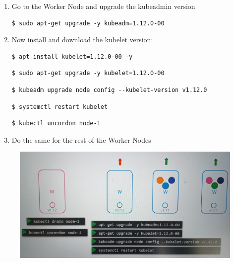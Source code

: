 \documentclass{article}
\newenvironment{codetemplate}[1][]{%
  \mybasecolorbox[#1]
  \itshape
}{%
  \endmybasecolorbox
}
\begin{document}
\begin{enumerate}
    \item Go to the Worker Node and upgrade the kubeadmin version
\begin{codetemplate}{}
\begin{verbatim}
$ sudo apt-get upgrade -y kubeadm=1.12.0-00
\end{verbatim}
\end{codetemplate}

    \item Now install and download the kubelet version:
\begin{codetemplate}{}
\begin{verbatim}
$ apt install kubelet=1.12.0-00 -y
\end{verbatim}
\end{codetemplate}
\begin{codetemplate}{}
\begin{verbatim}
$ sudo apt-get upgrade -y kubelet=1.12.0-00
\end{verbatim}
\end{codetemplate}
\begin{codetemplate}{}
\begin{verbatim}
$ kubeadm upgrade node config --kubelet-version v1.12.0
\end{verbatim}
\end{codetemplate}
\begin{codetemplate}{}
\begin{verbatim}
$ systemctl restart kubelet
\end{verbatim}
\end{codetemplate}
\begin{codetemplate}{}
\begin{verbatim}
$ kubectl uncordon node-1
\end{verbatim}
\end{codetemplate}

    \item Do the same for the rest of the Worker Nodes
\end{enumerate}

\begin{figure}[H]
    \includegraphics[width=\textwidth]{pictures/clusup2.png}
\end{figure}
\end{document}
